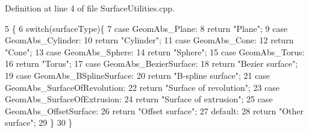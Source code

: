 Definition at line 4 of file Surface\+Utilities.\+cpp.


\begin{DoxyCode}
5                                         \{
6     \textcolor{keywordflow}{switch}(surfaceType)\{
7     \textcolor{keywordflow}{case} GeomAbs\_Plane:
8         \textcolor{keywordflow}{return} \textcolor{stringliteral}{"Plane"};
9     \textcolor{keywordflow}{case} GeomAbs\_Cylinder:
10         \textcolor{keywordflow}{return} \textcolor{stringliteral}{"Cylinder"};
11     \textcolor{keywordflow}{case} GeomAbs\_Cone:
12         \textcolor{keywordflow}{return} \textcolor{stringliteral}{"Cone"};
13     \textcolor{keywordflow}{case} GeomAbs\_Sphere:
14         \textcolor{keywordflow}{return} \textcolor{stringliteral}{"Sphere"};
15     \textcolor{keywordflow}{case} GeomAbs\_Torus:
16         \textcolor{keywordflow}{return} \textcolor{stringliteral}{"Torus"};
17     \textcolor{keywordflow}{case} GeomAbs\_BezierSurface:
18         \textcolor{keywordflow}{return} \textcolor{stringliteral}{"Bezier surface"};
19     \textcolor{keywordflow}{case} GeomAbs\_BSplineSurface:
20         \textcolor{keywordflow}{return} \textcolor{stringliteral}{"B-spline surface"};
21     \textcolor{keywordflow}{case} GeomAbs\_SurfaceOfRevolution:
22         \textcolor{keywordflow}{return} \textcolor{stringliteral}{"Surface of revolution"};
23     \textcolor{keywordflow}{case} GeomAbs\_SurfaceOfExtrusion:
24         \textcolor{keywordflow}{return} \textcolor{stringliteral}{"Surface of extrusion"};
25     \textcolor{keywordflow}{case} GeomAbs\_OffsetSurface:
26         \textcolor{keywordflow}{return} \textcolor{stringliteral}{"Offset surface"};
27     \textcolor{keywordflow}{default}:
28         \textcolor{keywordflow}{return} \textcolor{stringliteral}{"Other surface"};
29     \}
30 \}
\end{DoxyCode}

